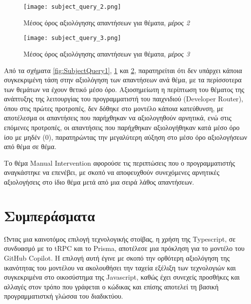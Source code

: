   \begin{figure}[H]
    \begin{center}
      \texttt{[image: subject\_query\_2.png]}
      \caption{Μέσος όρος αξιολόγησης απαντήσεων για θέματα, \textit{μέρος
      2}}
    \end{center}
    \label{fig:SubjectQuery2}
  \end{figure}

  \begin{figure}[H]
    \begin{center}
      \texttt{[image: subject\_query\_3.png]}
      \caption{Μέσος όρος αξιολόγησης απαντήσεων για θέματα, \textit{μέρος
      3}}
    \end{center}
    \label{fig:SubjectQuery3}
  \end{figure}

  Από τα σχήματα \ref{fig:SubjectQuery1}, \ref{fig:SubjectQuery2} και
  \ref{fig:SubjectQuery3}, παρατηρείται ότι δεν υπάρχει κάποια
  συγκεκριμένη τάση στην αξιολόγηση των απαντήσεων ανά θέμα, με τα
  περίσσοτερα των θεμάτων να έχουν θετικό μέσο όρο. Αξιοσημείωτη η
  περίπτωση του θέματος της ανάπτυξης της λειτουργίας του προγραμματιστή
  του παιχνιδιού (\textlatin{Developer Router}), όπου στις πρώτες
  προτροπές, δεν δόθηκε στο μοντέλο κάποια κατεύθυνση, με αποτέλεσμα οι
  απαντήσεις που παρήχθηκαν να αξιολογηθούν αρνητικά, ενώ στις επόμενες
  προτροπές, οι απαντήσεις που παρήχθηκαν αξιολογήθηκαν κατά μέσο όρο ίσο
  με μηδέν (0), παρατηρώντας την μεγαλύτερη αύξηση στο μέσο όρο
  αξιολογήσεων από θέμα σε θέμα.

  Το θέμα \textlatin{Manual Intervention} αφορούσε τις περιπτώσεις που ο
  προγραμματιστής αναγκάστηκε να επενέβει, με σκοπό να αποφευχθούν
  συνεχόμενες αρνητικές αξιολογήσεις στο ίδιο θέμα μετά από μια σειρά
  λάθος απαντήσεων.

  \section{Συμπεράσματα}

  Ώντας μια καινοτόμος επιλογή τεχνολογικής στοίβας, η χρήση της
  \textlatin{Typescript}, σε συνδυασμό με το \textlatin{tRPC} και το
  \textlatin{Prisma}, αποτέλεσε μια πρόκληση για το μοντέλο του
  \textlatin{GitHub Copilot}. Η επιλογή αυτή έγινε με σκοπό την ορθότερη
  αξιολόγηση της ικανότητας του μοντέλου να ακολουθήσει την ταχεία εξέλιξη
  των τεχνολογιών και συγκεκριμένα στο οικοσύστημα της
  \textlatin{Javascript}, καθώς έχει συνεχείς προσθήκες και αλλαγές στον
  τρόπο που γράφεται ο κώδικας και επίσης αποτελεί τη βασική
  προγραμματιστκή γλώσσα του διαδικτύου.

